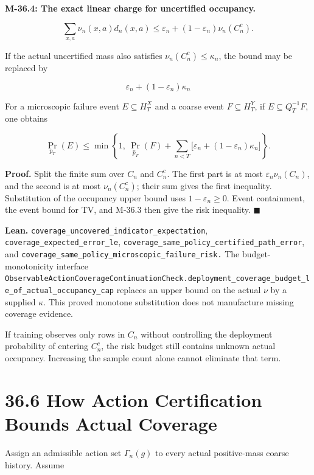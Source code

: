 \documentclass[
  english,
  11pt,
  oneside]{book}
\begin{document}
\hypertarget{m-36-4}{}\label{m-36-4}

\textbf{M-36.4: The exact linear charge for uncertified occupancy.}

\[\sum_{x,a}\nu_n(x,a)d_n(x,a)
\le
\varepsilon_n+(1-\varepsilon_n)\nu_n(C_n^c).\]

If the actual uncertified mass also satisfies \(\nu_n(C_n^c)\le\kappa_n\), the bound may be replaced by

\[\varepsilon_n+(1-\varepsilon_n)\kappa_n\]

For a microscopic failure event \(E\subseteq H_T^X\) and a coarse event \(F\subseteq H_T^Y\), if \(E\subseteq Q_T^{-1}F\), one obtains

\[\Pr_{p_T}(E)\le
\min\left\{1,\ \Pr_{\widehat p_T}(F)
+\sum_{n<T}\bigl[\varepsilon_n+(1-\varepsilon_n)\kappa_n\bigr]\right\}.\]

\textbf{Proof.} Split the finite sum over \(C_n\) and \(C_n^c\). The first part is at most \(\varepsilon_n\nu_n(C_n)\), and the second is at most \(\nu_n(C_n^c)\); their sum gives the first inequality. Substitution of the occupancy upper bound uses \(1-\varepsilon_n\ge0\). Event containment, the event bound for TV, and M-36.3 then give the risk inequality. \(\blacksquare\)

\textbf{Lean.} \nolinkurl{coverage_uncovered_indicator_expectation}, \nolinkurl{coverage_expected_error_le}, \nolinkurl{coverage_same_policy_certified_path_error}, and \nolinkurl{coverage_same_policy_microscopic_failure_risk.} The budget-monotonicity interface \nolinkurl{ObservableActionCoverageContinuationCheck.deployment_coverage_budget_le_of_actual_occupancy_cap} replaces an upper bound on the actual \(\nu\) by a supplied \(\kappa\). This proved monotone substitution does not manufacture missing coverage evidence.

If training observes only rows in \(C_n\) without controlling the deployment probability of entering \(C_n^c\), the risk budget still contains unknown actual occupancy. Increasing the sample count alone cannot eliminate that term.

\section{36.6 How Action Certification Bounds Actual Coverage}\label{how-action-certification-bounds-actual-coverage}

Assign an admissible action set \(\Gamma_n(g)\) to every actual positive-mass coarse history. Assume
\end{document}
